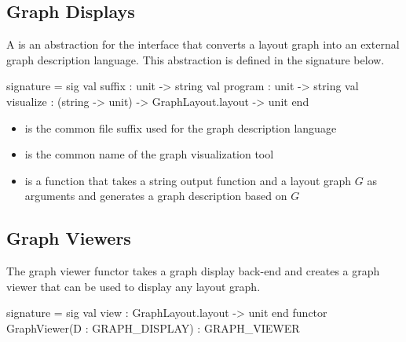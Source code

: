 \subsection{Graph Displays}

A  is an abstraction for the
interface that converts a layout graph into an external graph 
description language.  This abstraction is defined in the
signature below.
\begin{SML}
 signature  = sig
   val suffix    : unit -> string
   val program   : unit -> string
   val visualize : (string -> unit) -> GraphLayout.layout -> unit
 end
\end{SML}
\begin{itemize}
\item {} is the common file suffix used for the graph description
language 
\item {} is the common name of the graph visualization tool
\item {} is a function that takes a 
string output function and a layout graph $G$ as arguments
and generates a graph description based on $G$
\end{itemize}

\subsection{Graph Viewers}

The graph viewer functor 
takes a graph display back-end and creates a graph viewer
that can be used to display any layout graph.

\begin{SML}
 signature  = sig
    val view : GraphLayout.layout -> unit
 end
 functor GraphViewer(D : GRAPH_DISPLAY) : GRAPH_VIEWER
\end{SML}
